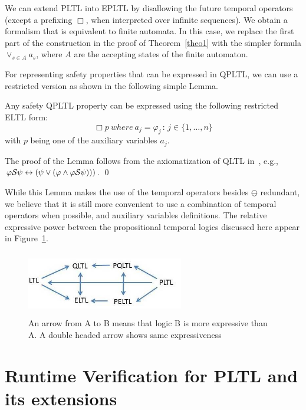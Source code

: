 We can extend PLTL into EPLTL by disallowing the future temporal operators (except a prefixing $\Box$, when interpreted over infinite sequences). We obtain
a formalism that is equivalent to finite automata. In this case, 
we replace the first part of the construction in the proof of Theorem~\ref{theo1}
with the simpler formula $\vee_{s \in A} a_s$, where $A$ are the accepting states of the finite automaton.

For representing safety properties that can be expressed in QPLTL, we can use a restricted version as shown in the following simple Lemma.
\begin{lemma}
\label{simplecase}
Any safety QPLTL property can be expressed using the following restricted
ELTL form:
\[  \Box p {\ where\ } a_j  = \varphi_j \, : \, 
 {j \in \{1, \ldots , n\}}  \] 
 with $p$ being one of the auxiliary variables $a_j$.
\end{lemma}
 The proof of the Lemma follows from the
axiomatization of QLTL in~\cite{MP}, e.g.,
$\varphi {\cal S} \psi \leftrightarrow ( \psi \vee ( \varphi \wedge \varphi {\cal S} \psi) ) )$. \qed

While this Lemma makes the use of the temporal operators
besides $\ominus$ redundant, we believe that it is still
more convenient to use a combination of
temporal operators when possible, and
auxiliary variables definitions.
The relative expressive power between the propositional temporal logics discussed here
appear in Figure~\ref{prop}.






\begin{figure}
\begin{center}
\includegraphics[height=1.1in,width=2.7in]{PROP.jpg}
\caption{\label{prop} An arrow from A to B means that logic  B is more expressive than A. A double headed arrow shows same expressiveness}
\end{center}
\end{figure}




\section{Runtime Verification for PLTL and its extensions}
\label{LTLruntime}

